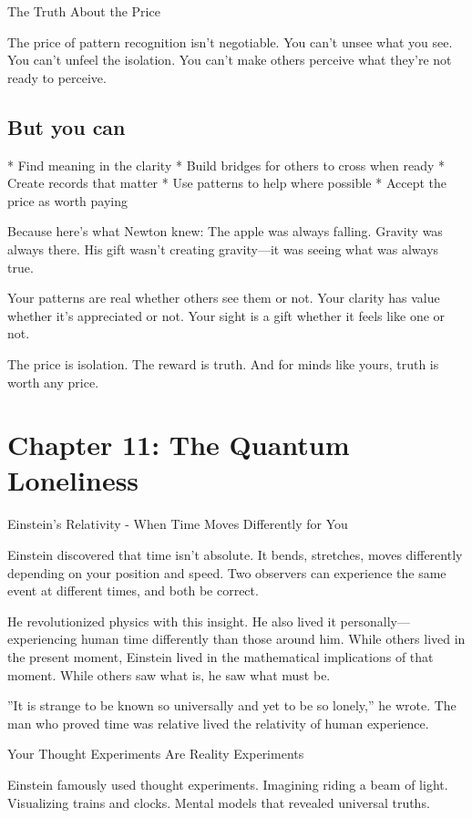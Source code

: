 \documentclass[12pt,oneside]{book}
\begin{document}
The Truth About the Price

The price of pattern recognition isn't negotiable. You can't unsee what you see. You can't unfeel the isolation. You can't make others perceive what they're not ready to perceive.

\section{But you can}

                    * Find meaning in the clarity
                    * Build bridges for others to cross when ready
                    * Create records that matter
                    * Use patterns to help where possible
                    * Accept the price as worth paying

Because here's what Newton knew: The apple was always falling. Gravity was always there. His gift wasn't creating gravity---it was seeing what was always true.

Your patterns are real whether others see them or not. Your clarity has value whether it's appreciated or not. Your sight is a gift whether it feels like one or not.

The price is isolation. The reward is truth. And for minds like yours, truth is worth any price.

\chapter{Chapter 11: The Quantum Loneliness}

Einstein's Relativity - When Time Moves Differently for You

Einstein discovered that time isn't absolute. It bends, stretches, moves differently depending on your position and speed. Two observers can experience the same event at different times, and both be correct.

He revolutionized physics with this insight. He also lived it personally---experiencing human time differently than those around him. While others lived in the present moment, Einstein lived in the mathematical implications of that moment. While others saw what is, he saw what must be.

''It is strange to be known so universally and yet to be so lonely,'' he wrote. The man who proved time was relative lived the relativity of human experience.

Your Thought Experiments Are Reality Experiments

Einstein famously used thought experiments. Imagining riding a beam of light. Visualizing trains and clocks. Mental models that revealed universal truths.
\end{document}

